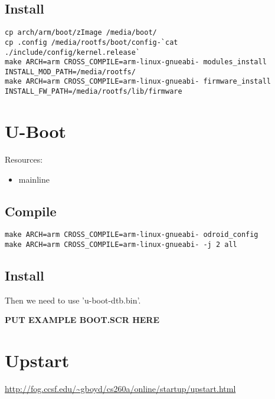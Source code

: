\subsection{Install}

\begin{lstlisting}
cp arch/arm/boot/zImage /media/boot/
cp .config /media/rootfs/boot/config-`cat ./include/config/kernel.release`
make ARCH=arm CROSS_COMPILE=arm-linux-gnueabi- modules_install INSTALL_MOD_PATH=/media/rootfs/
make ARCH=arm CROSS_COMPILE=arm-linux-gnueabi- firmware_install INSTALL_FW_PATH=/media/rootfs/lib/firmware
\end{lstlisting}

\section{U-Boot}

Resources:
\begin{itemize}
 \item mainline
\end{itemize}

\subsection{Compile}

\begin{lstlisting}
make ARCH=arm CROSS_COMPILE=arm-linux-gnueabi- odroid_config
make ARCH=arm CROSS_COMPILE=arm-linux-gnueabi- -j 2 all
\end{lstlisting}

\subsection{Install}

Then we need to use 'u-boot-dtb.bin'.

\textbf{PUT EXAMPLE BOOT.SCR HERE}






\section{Upstart}

\url{http://fog.ccsf.edu/~gboyd/cs260a/online/startup/upstart.html}

